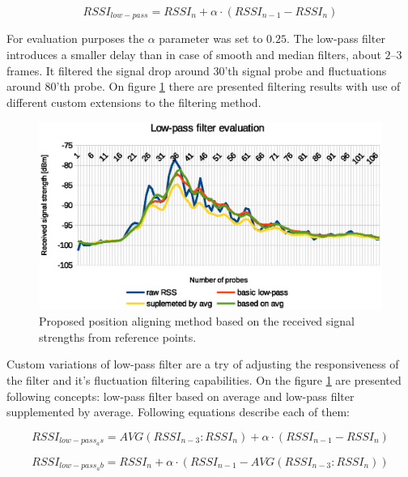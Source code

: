 \documentclass[../main.tex]{subfiles}
\begin{document}
\begin{equation}
\label{eq:low-pass_filter}
	RSSI_{low-pass} = RSSI_{n} + \alpha \cdot (RSSI_{n-1} - RSSI_{n})
\end{equation}

For evaluation purposes the $\alpha$ parameter was set to $0.25$. The low-pass filter introduces a smaller delay than in case of smooth and median filters, about $2$--$3$ frames. It filtered the signal drop around $30$'th signal probe and fluctuations around $80$'th probe. On figure \ref{fig:filtering_low-pass} there are presented filtering results with use of different custom extensions to the filtering method.

\begin{figure}[!htbp]
\includegraphics[width=\textwidth]{pictures/filtering_low-pass}
\centering
\caption{Proposed position aligning method based on the received signal strengths from reference points.}
\label{fig:filtering_low-pass}
\end{figure}

Custom variations of low-pass filter are a try of adjusting the responsiveness of the filter and it's fluctuation filtering capabilities. On the figure \ref{fig:filtering_low-pass} are presented following concepts: low-pass filter based on average and low-pass filter supplemented by average. Following equations describe each of them:

\begin{equation}
\label{eq:low-pass_filter_avg_based}
	RSSI_{low-pass_as} = AVG(RSSI_{n-3}:RSSI_{n}) + \alpha \cdot (RSSI_{n-1} - RSSI_{n})
\end{equation}

\begin{equation}
\label{eq:low-pass_filter_avg_supplemented}
	RSSI_{low-pass_ab} = RSSI_{n} + \alpha \cdot (RSSI_{n-1} - AVG(RSSI_{n-3}:RSSI_{n}))
\end{equation}
\end{document}

